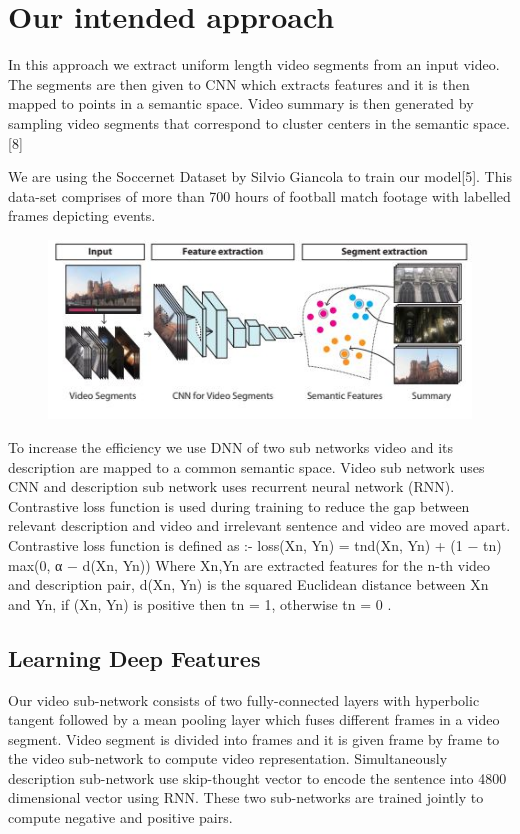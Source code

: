 \documentclass[twocolumn,showpacs,%
  nofootinbib,aps,superscriptaddress,%
  eqsecnum,prd,notitlepage,showkeys,10pt]{revtex4-1}
\begin{document}
\section{Our intended approach}

In this approach we extract uniform length video segments from an input video. The segments are then given to  CNN which extracts features and it is then mapped to points in a semantic space. Video summary is then generated by sampling video segments that correspond to cluster centers in the semantic space.[8]

We are using the Soccernet Dataset by Silvio Giancola to train our model[5]. This data-set comprises of more than 700 hours of football match footage with labelled frames depicting events. 

\begin{figure}[h]
\includegraphics[width=\linewidth]{img6.JPG}
\end{figure}

To increase the efficiency we use DNN of two sub networks  video and its description are mapped to a common semantic space. Video sub network uses CNN and description sub network uses recurrent neural network (RNN). Contrastive loss function is used during training to reduce the gap between relevant description and video and irrelevant sentence and video are moved apart.
Contrastive loss function is defined as :-
loss(Xn, Yn) = tnd(Xn, Yn) + (1 − tn) max(0, α − d(Xn, Yn))
Where Xn,Yn are extracted features for the n-th video and description pair,
d(Xn, Yn) is the squared Euclidean distance between Xn and Yn,
if (Xn, Yn) is positive then  tn = 1, otherwise tn = 0 .

\subsection{Learning Deep Features}

Our video sub-network consists of two fully-connected layers with hyperbolic tangent  followed by a mean pooling layer which fuses different frames in a video segment. Video segment is divided into frames and it is given frame by frame to the video sub-network to compute video representation. Simultaneously description sub-network use skip-thought vector to encode the sentence into 4800 dimensional vector using RNN. These two sub-networks are trained jointly to compute negative and positive pairs. 
\end{document}
